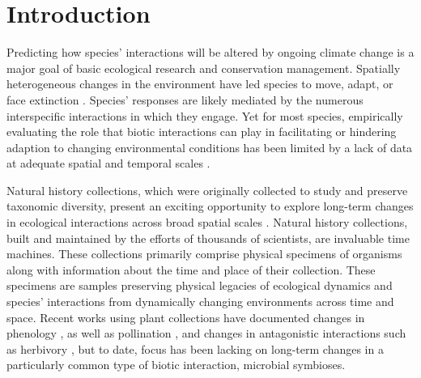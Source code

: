 \documentclass[11pt]{article}
\begin{document}
	
	\newpage{}
	
	\section*{Introduction}
	
Predicting how species' interactions will be altered by ongoing climate change is a major goal of basic ecological research and conservation management. 
Spatially heterogeneous changes in the environment have led species to move, adapt, or face extinction \citep{IPCC2012managing}. 
Species' responses are likely mediated by the numerous interspecific interactions in which they engage. 
Yet for most species, empirically evaluating the role that biotic interactions can play in facilitating or hindering adaption to changing environmental conditions has been limited by a lack of data at adequate spatial and temporal scales \cite{gilman2010framework}.

Natural history collections, which were originally collected to study and preserve taxonomic diversity, present an exciting opportunity to explore long-term changes in ecological interactions across broad spatial scales \citep{meineke2018unrealized}. 
Natural history collections, built and maintained by the efforts of thousands of scientists, are invaluable time machines. 
These collections primarily comprise physical specimens of organisms  along with information about the time and place of their collection. 
These specimens are samples preserving physical legacies of ecological dynamics and species' interactions from dynamically changing environments across time and space.
Recent works using plant collections have documented changes in phenology \citep{willis2017old, park2019herbarium,  berg2019examination}, as well as pollination \citep{pauw2011reconstruction, duan2019century}, and changes in antagonistic interactions such as herbivory \citep{meineke2019herbarium}, but to date, focus has been lacking on long-term changes in a particularly common type of biotic interaction, microbial symbioses. 
\end{document}

